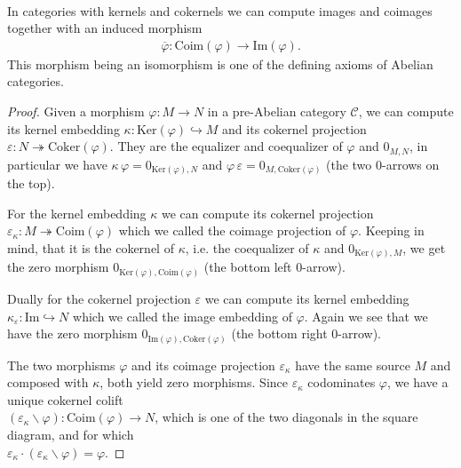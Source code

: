 \begin{remark}[Kernel lift of cokernel colift $=$ cokernel colift of kernel lift]\label{rmk:kerl_col_col_kerl}\phantom{}\\
In categories with kernels and cokernels we can compute images and coimages together with an induced morphism
\begin{align}
\overline{\varphi} : \mathrm{Coim}(\varphi) \rightarrow \mathrm{Im}(\varphi).
\end{align}
This morphism being an isomorphism is one of the defining axioms of Abelian categories.
\end{remark}
\begin{proof}
Given a morphism $\varphi : M \rightarrow N$ in a pre-Abelian category $\mathcal{C}$, we can compute its kernel embedding
$\kappa : \mathrm{Ker}(\varphi) \hookrightarrow M$ and its cokernel projection
$\varepsilon : N \twoheadrightarrow \mathrm{Coker}(\varphi)$. They are the equalizer and coequalizer of $\varphi$ and $0_{M,N}$,
in particular we have $\kappa \, \varphi = 0_{\mathrm{Ker}(\varphi),N}$ and
$\varphi \, \varepsilon = 0_{M,\mathrm{Coker}(\varphi)}$ (the two $0$-arrows on the top).

For the kernel embedding $\kappa$ we can compute its cokernel projection
$\varepsilon_{\kappa} : M \twoheadrightarrow \mathrm{Coim}(\varphi)$ which we called the coimage projection of $\varphi$.
Keeping in mind, that it is the cokernel of $\kappa$, i.e. the coequalizer of $\kappa$ and $0_{\mathrm{Ker}(\varphi),M}$, we get
the zero morphism $0_{\mathrm{Ker}(\varphi),\mathrm{Coim}(\varphi)}$ (the bottom left $0$-arrow).

Dually for the cokernel projection $\varepsilon$ we can compute its kernel embedding
$\kappa_{\varepsilon} : \mathrm{Im} \hookrightarrow N$ which we called the image embedding of $\varphi$. Again we see
that we have the zero morphism $0_{\mathrm{Im}(\varphi),\mathrm{Coker}(\varphi)}$ (the bottom right $0$-arrow).

The two morphisms $\varphi$ and its coimage projection $\varepsilon_{\kappa}$ have the same source $M$ and
composed with $\kappa$, both yield zero morphisms. Since $\varepsilon_{\kappa}$ codominates $\varphi$, we have
a unique cokernel colift\\
$(\varepsilon_{\kappa}\backslash \varphi) : \mathrm{Coim}(\varphi) \rightarrow N$, which is one of the two diagonals
in the square diagram, and for which\\
$\varepsilon_{\kappa} \cdot (\varepsilon_{\kappa}\backslash \varphi) = \varphi$.


\end{proof}
